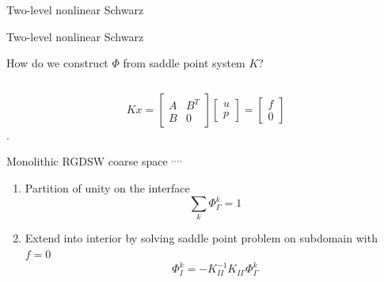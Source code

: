 \begin{frame}{Two-level nonlinear Schwarz}
	\hspace*{-7mm}
	
\end{frame}

\begin{frame}[noframenumbering]{Two-level nonlinear Schwarz}
	\hspace*{-7mm}
	
\end{frame}

\begin{frame}{How do we construct $\varPhi$ from saddle point system $K$?}
	\begin{columns}
		\begin{column}{0.52\textwidth}
			\vspace{-6mm}
			\begin{equation*}
				Kx = \begin{bmatrix} A & B^T \\ B & 0 \end{bmatrix}\begin{bmatrix}u\\p\end{bmatrix} = \begin{bmatrix}f\\0\end{bmatrix}
			\end{equation*}.
			\vspace{-3mm}
			\begin{block}{\normalsize Monolithic RGDSW coarse space \footnotemark[1]$^,$\footnotemark[2]$^,$\footnotemark[3]$^,$\footnotemark[4]$^,$\footnotemark[5]}
				\begin{enumerate}
					\item Partition of unity on the interface \begin{equation*}\sum_k \varPhi_\Gamma^k = 1\end{equation*}
					\item<3-> Extend into interior by solving saddle point problem on subdomain with $f = 0$
					      \begin{equation*}
						      \varPhi_I^k = -K_{II}^{-1}K_{I\Gamma}\varPhi_\Gamma^k
					      \end{equation*}
				\end{enumerate}
                \vspace{-2mm}
			\end{block}
		\end{column}

\end{columns}
\end{frame}
